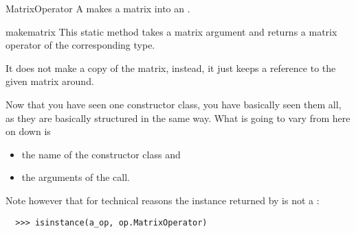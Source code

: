 \begin{classdesc*}{MatrixOperator}
  A  makes a matrix into an .
\end{classdesc*}
\begin{methoddesc}{make}{matrix}
  This static method takes a matrix argument and returns a matrix
  operator of the corresponding type.

  It does not make a copy of the matrix, instead, it just keeps
  a reference to the given matrix around.
\end{methoddesc}

Now that you have seen one constructor class, you have basically
seen them all, as they are basically structured in the same way.
What is going to vary from here on down is
\begin{itemize}
\item the name of the constructor class and
\item the arguments of the  call.
\end{itemize}
Note however that for technical reasons the instance returned by
 is not a :
\begin{verbatim}
  >>> isinstance(a_op, op.MatrixOperator)
\end{verbatim}

